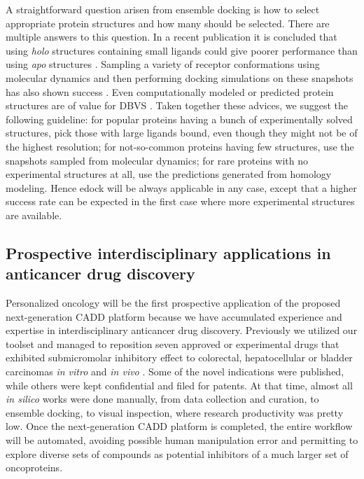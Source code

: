 \documentclass[a4paper,12pt]{article}
\begin{document}
A straightforward question arisen from ensemble docking is how to select appropriate protein structures and how many should be selected. There are multiple answers to this question. In a recent publication it is concluded that using \textit{holo} structures containing small ligands could give poorer performance than using \textit{apo} structures \citep{1704}. Sampling a variety of receptor conformations using molecular dynamics and then performing docking simulations on these snapshots has also shown success \citep{1730}. Even computationally modeled or predicted protein structures are of value for DBVS \citep{1322,1277}. Taken together these advices, we suggest the following guideline: for popular proteins having a bunch of experimentally solved structures, pick those with large ligands bound, even though they might not be of the highest resolution; for not-so-common proteins having few structures, use the snapshots sampled from molecular dynamics; for rare proteins with no experimental structures at all, use the predictions generated from homology modeling. Hence edock will be always applicable in any case, except that a higher success rate can be expected in the first case where more experimental structures are available.

\subsection*{Prospective interdisciplinary applications in anticancer drug discovery}

Personalized oncology will be the first prospective application of the proposed next-generation CADD platform because we have accumulated experience and expertise in interdisciplinary anticancer drug discovery. Previously we utilized our toolset and managed to reposition seven approved or experimental drugs that exhibited submicromolar inhibitory effect to colorectal, hepatocellular or bladder carcinomas \textit{in vitro} and \textit{in vivo} \citep{1667,1681}. Some of the novel indications were published, while others were kept confidential and filed for patents. At that time, almost all \textit{in silico} works were done manually, from data collection and curation, to ensemble docking, to visual inspection, where research productivity was pretty low. Once the next-generation CADD platform is completed, the entire workflow will be automated, avoiding possible human manipulation error and permitting to explore diverse sets of compounds as potential inhibitors of a much larger set of oncoproteins.
\end{document}
